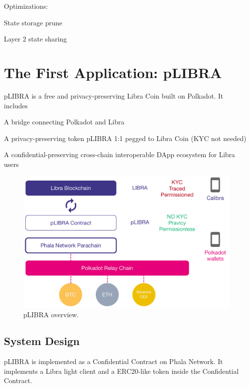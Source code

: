 Optimizations:

\begin{icompact}
    \item State storage prune
    \item Layer 2 state sharing
\end{icompact}


\section{The First Application: pLIBRA}

pLIBRA is a free and privacy-preserving Libra Coin built on Polkadot. It includes

\begin{icompact}
    \item A bridge connecting Polkadot and Libra
    \item A privacy-preserving token pLIBRA 1:1 pegged to Libra Coin (KYC not needed)
    \item A confidential-preserving cross-chain interoperable DApp ecosystem for Libra users
\end{icompact}

\begin{figure}
    \centering \footnotesize
    \includegraphics[width=.7\columnwidth]{img/pLIBRA-structure}
    \caption{pLIBRA overview.}
    \label{fig:plibra}
\end{figure}

\subsection{System Design}

pLIBRA is implemented as a Confidential Contract on Phala Network. It implements a Libra light client and a ERC20-like token inside the Confidential Contract.

